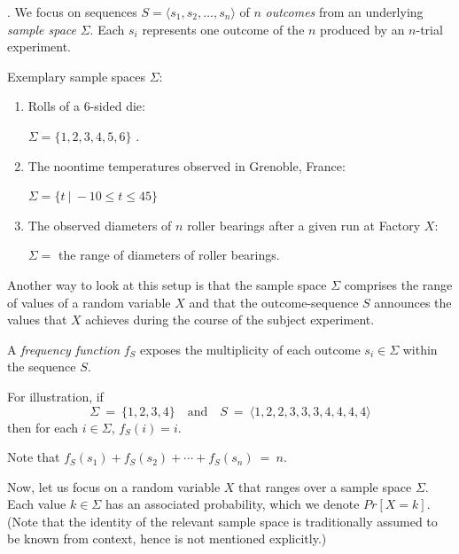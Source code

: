 \medskip

.
We focus on sequences $S = \langle s_1, s_2, \ldots, s_n \rangle$ of $n$ {\it outcomes} from an underlying {\it sample space} $\Sigma$.  Each $s_i$ represents one outcome of the $n$ produced by an $n$-trial experiment.

\smallskip

Exemplary sample spaces $\Sigma$:
  \begin{enumerate}
  \item
Rolls of a $6$-sided die:

$\Sigma = \{1, 2, 3, 4, 5, 6\}$ .
  \medskip\item
The noontime temperatures observed in Grenoble, France:

$\Sigma = \{ t \ | \ -10 \leq t \leq 45\}$
  \medskip\item
The observed diameters of $n$ roller bearings after a given run at Factory $X$:

$\Sigma =$ the range of diameters of roller bearings.
  \end{enumerate}

Another way to look at this setup is that the sample space $\Sigma$ comprises the range of values of a random variable $X$ and that the outcome-sequence $S$ announces the values that $X$ achieves during the course of the subject experiment.

\medskip

A {\it frequency function} $f_S$ exposes the multiplicity of each outcome $s_i \in \Sigma$ within the sequence $S$.

\smallskip

For illustration, if 
\begin{equation}
\label{eq:sample-seq-10}
\Sigma \ = \  \{1, 2, 3, 4\} \ \ \ \mbox{ and } \ \ \
S \ = \ \langle 1, 2, 2, 3, 3, 3, 4, 4, 4, 4 \rangle
\end{equation}
then for each $i \in \Sigma$, $f_S(i) = i$.

\smallskip

Note that $f_S(s_1) + f_S(s_2) + \cdots + f_S(s_n) \ = \ n$.

\medskip


Now, let us focus on a random variable $X$ that ranges over a sample space $\Sigma$.  Each value $k \in \Sigma$ has an associated probability, which we denote $Pr[X=k]$.  (Note that the identity of the relevant sample space is traditionally assumed to be known from context, hence is not mentioned explicitly.)

